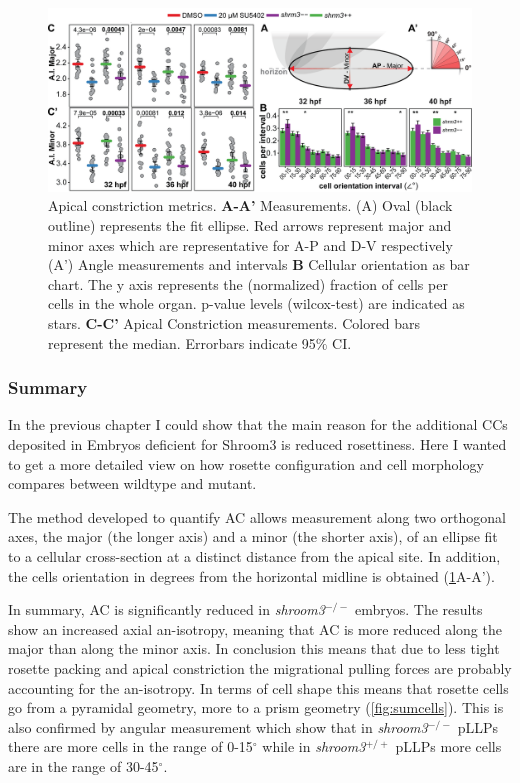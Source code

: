 \documentclass[11pt,singlespacinge,twoside]{reedthesis} %
\theoremstyle{definition}
\theoremstyle{definition}
\theoremstyle{definition}
\theoremstyle{remark}
\begin{document}
\begin{figure}

{\centering \includegraphics[width=0.95\linewidth]{figures/results/04_constriction/Figure_5-2} 

}

\caption[3D metrics and pLLP maps]{Apical constriction metrics. \textbf{A-A'} Measurements. (A) Oval (black outline) represents the fit ellipse. Red arrows represent major and minor axes which are representative for A-P and D-V respectively (A') Angle measurements and intervals \textbf{B} Cellular orientation as bar chart. The y axis represents the (normalized) fraction of cells per cells in the whole organ. p-value levels (wilcox-test) are indicated as stars. \textbf{C-C'} Apical Constriction measurements. Colored bars represent the median. Errorbars indicate 95\(\%\) CI.}\label{fig:acaci}
\end{figure}
\hypertarget{sum-ai}{%
\subsubsection{Summary}\label{sum-ai}}

In the previous chapter I could show that the main reason for the additional CCs deposited in Embryos deficient for Shroom3 is reduced rosettiness. Here I wanted to get a more detailed view on how rosette configuration and cell morphology compares between wildtype and mutant.

The method developed to quantify AC allows measurement along two orthogonal axes, the major (the longer axis) and a minor (the shorter axis), of an ellipse fit to a cellular cross-section at a distinct distance from the apical site. In addition, the cells orientation in degrees from the horizontal midline is obtained (\ref{fig:acaci}A-A').

In summary, AC is significantly reduced in \emph{shroom3}\(^{-/-}\) embryos. The results show an increased axial an-isotropy, meaning that AC is more reduced along the major than along the minor axis. In conclusion this means that due to less tight rosette packing and apical constriction the migrational pulling forces are probably accounting for the an-isotropy. In terms of cell shape this means that rosette cells go from a pyramidal geometry, more to a prism geometry (\ref{fig:sumcells}). This is also confirmed by angular measurement which show that in \emph{shroom3}\(^{-/-}\) pLLPs there are more cells in the range of 0-15\(^\circ\) while in \emph{shroom3}\(^{+/+}\) pLLPs more cells are in the range of 30-45\(^\circ\).
\end{document}
